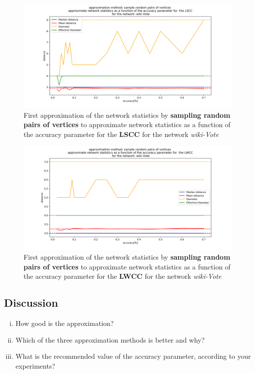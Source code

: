 \documentclass[12pt,a4paper]{article}
\begin{document}
\begin{figure}[h!]
\includegraphics[width=0.9\linewidth]{figures/2_2_wiki-Vote_lscc.png}
\caption{First approximation of the network statistics by \textbf{sampling random pairs of vertices} to approximate network statistics as a function of the accuracy parameter for the \textbf{LSCC} for the network \textit{wiki-Vote}}
\label{pic:2_2_wiki-Vote_lscc}
\end{figure}

\begin{figure}[h!]
\includegraphics[width=0.9\linewidth]{figures/2_2_wiki-Vote_lwcc.png}
\caption{First approximation of the network statistics by \textbf{sampling random pairs of vertices} to approximate network statistics as a function of the accuracy parameter for the \textbf{LWCC} for the network \textit{wiki-Vote}}
\label{pic:2_2_wiki-Vote_lwcc}
\end{figure}


\subsection{Discussion}

\begin{enumerate}[(i)]
\item How good is the approximation?
\item Which of the three approximation methods is better and why?
\item What is the recommended value of the accuracy parameter, according to your experiments?
\end{enumerate}
\end{document}
